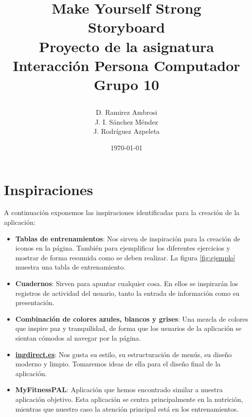 \documentclass[a4paper]{article}
\date{}
\author{D. Ramirez Ambrosi \\ J. I. Sánchez Méndez \\ J. Rodríguez Azpeleta}
\title{\begin{center}
\textbf{\Huge{Make Yourself Strong}} \\ Storyboard  \\Proyecto de la asignatura Interacción Persona Computador \\ \Huge{Grupo 10}
\end{center}}
\date{\today}
\renewcommand\listfigurename{\centering LISTA DE FIGURAS}
\begin{document}
\maketitle

\thispagestyle{empty}%
\newpage
\tableofcontents%
\thispagestyle{empty}
\newpage





\setcounter{page}{1}%


\section{Inspiraciones}

A continuación exponemos las inspiraciones identificadas para la creación de la aplicación:

\begin{itemize}
	
	\item   \textbf{Tablas de entrenamientos}: Nos sirven de inspiración para la creación de iconos en la página. También para ejemplificar los diferentes ejercicios y mostrar de forma resumida como se deben realizar. La figura \ref{fig:ejemplo} muestra una tabla de entrenamiento.
	
	\item   \textbf{Cuadernos}: Sirven para apuntar cualquier cosa. En ellos se inspirarán los registros de actividad del usuario, tanto la entrada de información como su presentación.
	
	\item   \textbf{Combinación de colores azules, blancos y grises}: Una mezcla de colores que inspire paz y tranquilidad, de forma que los usuarios de la aplicación se sientan cómodos al navegar por la página.
	
	\item  \textbf{\url{ingdirect.es}}: Nos gusta su estilo, su estructuración de menús, su diseño moderno y limpio. Tomaremos ideas de ella para el diseño final de la aplicación.
	
	\item   \textbf{MyFitnessPAL}: Aplicación que hemos encontrado similar a nuestra aplicación objetivo. Esta aplicación se centra principalmente en la nutrición, mientras que nuestro caso la atención principal está en los entrenamientos.
\end{itemize}
\end{document}
